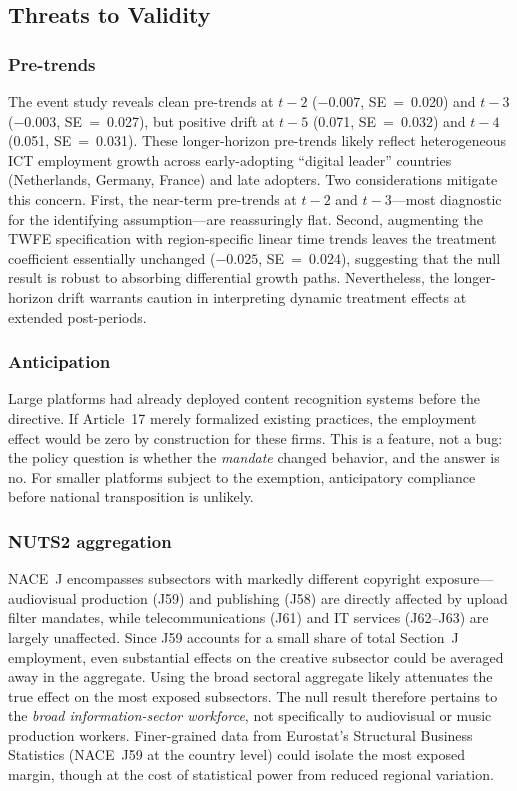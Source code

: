 \documentclass[12pt]{article}
\begin{document}
\subsection{Threats to Validity}

\subsubsection*{Pre-trends} The event study reveals clean pre-trends at $t-2$ ($-0.007$, SE~=~0.020) and $t-3$ ($-0.003$, SE~=~0.027), but positive drift at $t-5$ (0.071, SE~=~0.032) and $t-4$ (0.051, SE~=~0.031). These longer-horizon pre-trends likely reflect heterogeneous ICT employment growth across early-adopting ``digital leader'' countries (Netherlands, Germany, France) and late adopters. Two considerations mitigate this concern. First, the near-term pre-trends at $t-2$ and $t-3$---most diagnostic for the identifying assumption---are reassuringly flat. Second, augmenting the TWFE specification with region-specific linear time trends leaves the treatment coefficient essentially unchanged ($-0.025$, SE~=~0.024), suggesting that the null result is robust to absorbing differential growth paths. Nevertheless, the longer-horizon drift warrants caution in interpreting dynamic treatment effects at extended post-periods.

\subsubsection*{Anticipation} Large platforms had already deployed content recognition systems before the directive. If Article~17 merely formalized existing practices, the employment effect would be zero by construction for these firms. This is a feature, not a bug: the policy question is whether the \emph{mandate} changed behavior, and the answer is no. For smaller platforms subject to the exemption, anticipatory compliance before national transposition is unlikely.

\subsubsection*{NUTS2 aggregation} NACE~J encompasses subsectors with markedly different copyright exposure---audiovisual production (J59) and publishing (J58) are directly affected by upload filter mandates, while telecommunications (J61) and IT services (J62--J63) are largely unaffected. Since J59 accounts for a small share of total Section~J employment, even substantial effects on the creative subsector could be averaged away in the aggregate. Using the broad sectoral aggregate likely attenuates the true effect on the most exposed subsectors. The null result therefore pertains to the \emph{broad information-sector workforce}, not specifically to audiovisual or music production workers. Finer-grained data from Eurostat's Structural Business Statistics (NACE~J59 at the country level) could isolate the most exposed margin, though at the cost of statistical power from reduced regional variation.
\end{document}
